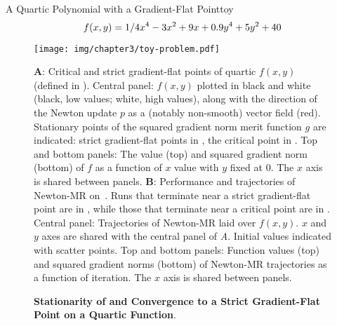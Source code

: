 \documentclass[../../thesis.tex]{subfiles}
\begin{document}
\begin{example}{A Quartic Polynomial with a Gradient-Flat Point}{toy}
	\begin{equation}\equationlabel{toy}
	    f(x, y) = 1/4 x^4 - 3x^2 + 9x + 0.9y^4 + 5y^2 + 40
	\end{equation}
\end{example}

\begin{figure}
	\texttt{[image: img/chapter3/toy-problem.pdf]}
	\caption{\textbf{Stationarity of and Convergence to
	a Strict Gradient-Flat Point on a Quartic Function}.}%
	{\textbf{A}:
	Critical and strict gradient-flat points
	of quartic $f(x,y)$ (defined in ).
	Central panel:
	$f(x,y)$
	plotted in black and white
	(black, low values; white, high values),
	along with the direction of the Newton update $p$
	as a (notably non-smooth) vector field (red).
	Stationary points of
	the squared gradient norm merit function $g$ are indicated:
	strict gradient-flat points in \failcolor{},
	the critical point in \successcolor{}.
	Top and bottom panels:
	The value (top) and squared gradient norm (bottom)
	of $f$ as a function of $x$ value
	with $y$ fixed at 0.
	The $x$ axis is shared between panels.
	\textbf{B}:
	Performance and trajectories of Newton-MR
	on~.
	Runs that terminate near a strict gradient-flat point
	are in \failcolor{},
	while those that terminate near
	a critical point are in \successcolor{}.
	Central panel:
	Trajectories of Newton-MR laid over
	$f(x, y)$.
	$x$ and $y$ axes are shared with the central panel of
	\emph{A}.
	Initial values indicated with scatter points.
	Top and bottom panels:
	Function values (top) and squared gradient norms (bottom)
	of Newton-MR trajectories as a function of iteration.
	The $x$ axis is shared between panels.}
\end{figure}
\end{document}
